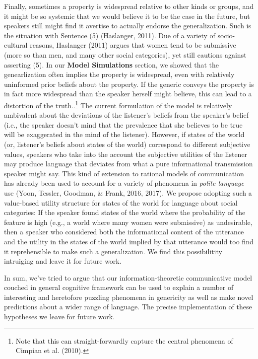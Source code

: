\documentclass[english,floatsintext,man]{apa6}
\theoremstyle{definition}
\theoremstyle{definition}
\theoremstyle{definition}
\theoremstyle{remark}
\begin{document}
Finally, sometimes a property is widespread relative to other kinds or
groups, and it might be so systemic that we would believe it to be the
case in the future, but speakers still might find it avertise to
actually endorse the generalization. Such is the situation with Sentence
(5) (Haslanger, 2011). Due of a variety of socio-cultural reasons,
Haslanger (2011) argues that women tend to be submissive (more so than
men, and many other social categories), yet still cautions against
asserting (5). In our \textbf{Model Simulations} section, we showed that
the genearlization often implies the property is widespread, even with
relatively uninformed prior beliefs about the property. If the generic
conveys the property is in fact more widespread than the speaker herself
might believe, this can lead to a distortion of the truth..\footnote{Note
  that this can straight-forwardly capture the central phenomena of
  Cimpian et al. (2010).} The current formulation of the model is
relatively ambivalent about the deviations of the listener's beliefs
from the speaker's belief (i.e., the speaker doesn't mind that the
prevalence that she believes to be true will be exaggerated in the mind
of the listener). However, if states of the world (or, listener's
beliefs about states of the world) correspond to different subjective
values, speakers who take into the account the subjective utilities of
the listener may produce language that deviates from what a pure
informational transmission speaker might say. This kind of extension to
rational models of communication has already been used to account for a
variety of phenomena in \emph{polite language} use (Yoon, Tessler,
Goodman, \& Frank, 2016, 2017). We propose adopting such a value-based
utility structure for states of the world for language about social
categories: If the speaker found states of the world where the
probability of the feature is high (e.g., a world where many women were
submissive) as undesirable, then a speaker who considered both the
informational content of the utterance and the utility in the states of
the world implied by that utterance would too find it reprehensible to
make such a generalization. We find this possibilitity intruiging and
leave it for future work.

In sum, we've tried to argue that our information-theoretic
communicative model couched in general cognitive framework can be used
to explain a number of interesting and heretofore puzzling phenomena in
genericity as well as make novel predictions about a wider range of
language. The precise implementation of these hypotheses we leave for
future work.
\end{document}
